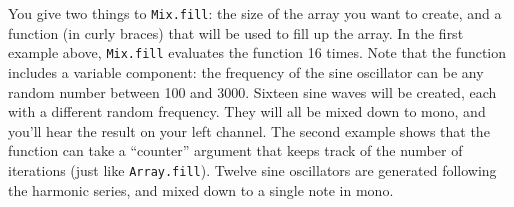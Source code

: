 You give two things to \texttt{Mix.fill}: the size of the array you want to create, and a function (in curly braces) that will be used to fill up the array. In the first example above, \texttt{Mix.fill} evaluates the function 16 times. Note that the function includes a variable component: the frequency of the sine oscillator can be any random number between 100 and 3000. Sixteen sine waves will be created, each with a different random frequency. They will all be mixed down to mono, and you'll hear the result on your left channel.
The second example shows that the function can take a ``counter'' argument that keeps track of the number of iterations (just like \texttt{Array.fill}). Twelve sine oscillators are generated following the harmonic series, and mixed down to a single note in mono.